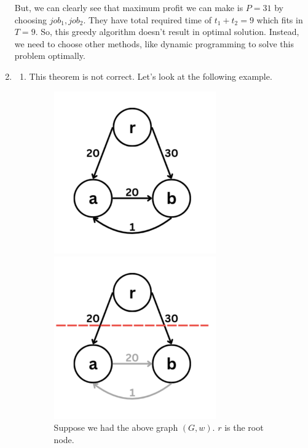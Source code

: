 \documentclass{article}
\begin{document}
\begin{enumerate}
  But, we can clearly see that maximum profit we can make is $P=31$ by choosing $job_1,job_2$.
  They have total required time of $t_1+t_2=9$ which fits in $T=9$.
  So, this greedy algorithm doesn't result in optimal solution.
  Instead, we need to choose other methods, like dynamic programming to solve this problem optimally.
  
  \item
    \begin{enumerate}
      \item This theorem is not correct. Let's look at the following example.

      \begin{figure}[H]
        \centering
        \begin{minipage}{0.4\textwidth}
          \centering
          \includegraphics[width=0.7\textwidth]{image1.png}
          \caption{Suppose we had the above graph $(G,w)$. $r$ is the root node.}
        \end{minipage}
        \hspace{1cm}
        \begin{minipage}{0.4\textwidth}
          \centering
          \includegraphics[width=0.7\textwidth]{image2.png}

\end{minipage}
\end{figure}
\end{enumerate}
\end{enumerate}
\end{document}
